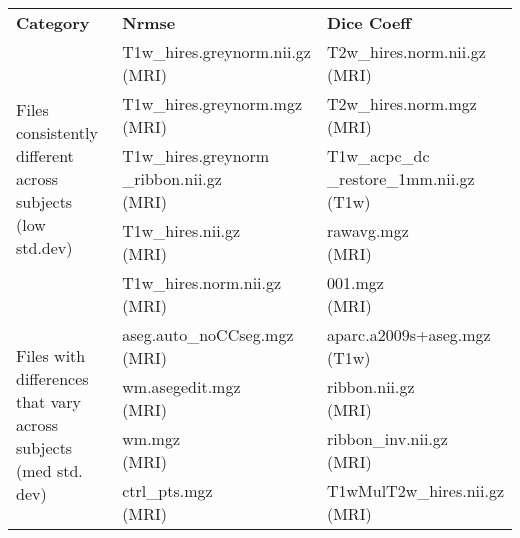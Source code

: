 \iffalse
\begin{center}
\begin{longtable}{|p{}|p{}|p{}|}
\cline{1-3}
\textbf{Category} & \textbf{Nrmse} & \textbf{Dice Coeff} \\\cline{1-3}
\multirow{5}{.3\textwidth}{Files consistently different across subjects (low std.dev)}     & \makecell[l]{T1w\_hires.greynorm.nii.gz \\ (MRI)}  & \makecell[l]{T2w\_hires.norm.nii.gz\\ (MRI)} \\\cline{2-3}
& \makecell[l]{T1w\_hires.greynorm.mgz\\(MRI)}                   & \makecell[l]{T2w\_hires.norm.mgz\\(MRI)} \\\cline{2-3}
& \makecell[l]{T1w\_hires.greynorm\\\_ribbon.nii.gz\\(MRI)}                        & \makecell[l]{T1w\_acpc\_dc\\\_restore\_1mm.nii.gz\\(T1w)} \\\cline{2-3}
& \makecell[l]{T1w\_hires.nii.gz\\(MRI)}              & \makecell[l]{rawavg.mgz\\(MRI)} \\\cline{2-3}
& \makecell[l]{T1w\_hires.norm.nii.gz\\(MRI)}                                        & \makecell[l]{001.mgz\\(MRI)} \\\cline{1-3}
\multirow{5}{.3\textwidth}{Files with differences that vary across subjects (med std. dev)} & \makecell[l]{aseg.auto\_noCCseg.mgz\\(MRI)}  & \makecell[l]{aparc.a2009s+aseg.mgz\\(T1w)} \\\cline{2-3}
& \makecell[l]{wm.asegedit.mgz\\(MRI)}                       & \makecell[l]{ribbon.nii.gz\\(MRI)} \\\cline{2-3}
& \makecell[l]{wm.mgz\\(MRI)}                           & \makecell[l]{ribbon\_inv.nii.gz\\(MRI)} \\\cline{2-3}
& \makecell[l]{ctrl\_pts.mgz\\(MRI)}                      & \makecell[l]{T1wMulT2w\_hires.nii.gz\\(MRI)} \\\cline{2-3}

\end{longtable}
\end{center}
